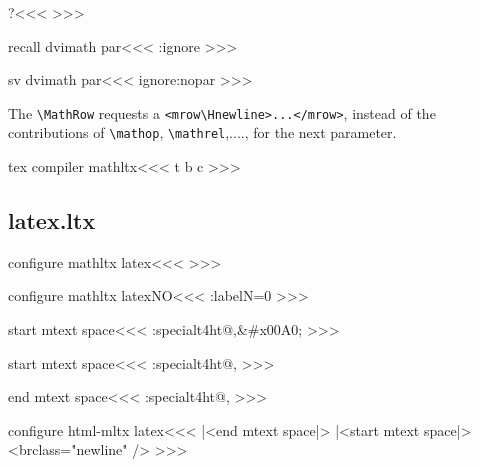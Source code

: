 {{\<?\><<<
\def\MathRow#1{%
   \Configure{\expandafter\:gobble\string#1*}{*}%
      {<mrow\Hnewline 
         \mml:class="\expandafter\:gobble\string#1">}{</mrow>}%
      {\Configure{\expandafter\:gobble\string#1}{}{}{}{}}#1}%
>>>


\<recall dvimath par\><<<
\sv:ignore
>>>

\<sv dvimath par\><<<
\edef\sv:ignore{\if:nopar  
    \noexpand\IgnorePar\else \noexpand\ShowPar\fi}%
>>>


The \verb'\MathRow' requests a \verb'<mrow\Hnewline>...</mrow>', instead of the contributions
of \verb'\mathop', \verb'\mathrel',...., for the next parameter.


\<tex compiler mathltx\><<<
\def\:MT{\ifmathltx m\fi}
\Configure{halignTB}{\HCode{<\:MT table }\halignTBL}{\HCode{>}}
   {t}{\ifmathltx {}\fi}
   {b}{\ifmathltx {}\fi}
   {c}{\ifmathltx {}\fi}
   {}
\def\t:HA{\HCode{</\:MT table>}}
\def\R:HA{\HCode{<\:MT tr \Hnewline style="vertical-align:baseline;">}}
\def\r:HA{\HCode{</\:MT tr>}}
\def\D:HA{\HCode{<\:MT td \ifnum \HMultispan>1 colspan="\HMultispan"\fi}%
   \halignTD \HCode{\Hnewline>}}
\def\d:HA{\HCode{</\:MT td>}}
>>>

\subsection{latex.ltx}

\<configure mathltx latex\><<<
\def\set:label#1{\ifmathltx
   \HCode{\%\Hnewline\%\string\begin{label}}%
     {\ht:special{t4ht@, }\let\:newlnch\space \mathltxfalse #1}%
   \HCode{\string\end{label}\Hnewline}%
  \else #1\fi
}
>>>


\<configure mathltx latexNO\><<<
\HAssign\set:labelN=0
\def\set:label#1{\ifmmode
    \gHAdvance\set:labelN by 1
    \expandafter\gdef\csname sl:\set:labelN\endcsname
         {\set:label{#1}}%
    \expandafter\aftergroup\csname sl:\set:labelN\endcsname
  \else \gHAssign\set:labelN=0 #1\fi
}
>>>


\<start mtext space\><<<
\ht:special{t4ht@,&\#x00A0;}%
>>>

\<start mtext space\><<<
\ht:special{t4ht@, }%
>>>

\<end mtext space\><<<
\ht:special{t4ht@,}%
>>>


\<configure html-mltx latex\><<<
  {\ifmtext |<end mtext space|>%
            |<start mtext space|>%
   \else \Tg<br\Hnewline class="newline" />\fi}
>>>

}}
